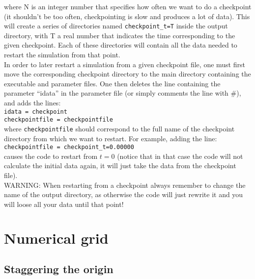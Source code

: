 \documentclass[12pt]{article}
\begin{document}
\noindent where N is an integer number that specifies how often we
want to do a checkpoint (it shouldn't be too often, checkpointing is
slow and produces a lot of data).  This will create a series of
directories named \texttt{checkpoint\_t=T} inside the output
directory, with T a real number that indicates the time corresponding
to the given checkpoint. Each of these directories will contain all
the data needed to restart the simulation from that point. \\

In order to later restart a simulation from a given checkpoint file,
one must first move the corresponding checkpoint directory to the main
directory containing the executable and parameter files.  One then
deletes the line containing the parameter ``idata'' in the parameter
file (or simply comments the line with \#), and adds the lines: \\

\texttt{idata = checkpoint} \\
\texttt{checkpointfile = checkpointfile} \\

\noindent where \texttt{checkpointfile} should correspond to the full
name of the checkpoint directory from which we want to restart. For
example, adding the line: \\

\texttt{checkpointfile = checkpoint\_t=0.00000} \\

causes the code to restart from $t=0$ (notice that in that case the code
will not calculate the initial data again, it will just take the data
from the checkpoint file). \\

WARNING: When restarting from a checkpoint always remember to change
the name of the output directory, as otherwise the code will just
rewrite it and you will loose all your data until that point!



\setcounter{equation}{0}
\section{Numerical grid}
\label{sec:grid}

\subsection{Staggering the origin}
\end{document}
